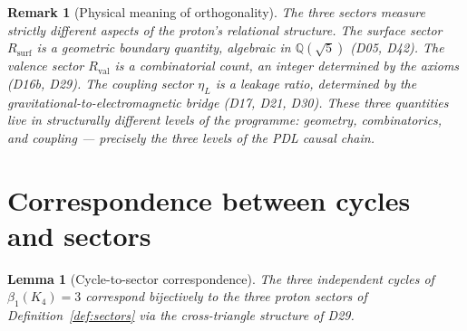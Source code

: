 \documentclass[12pt,a4paper]{article}
\newtheorem{lemma}[theorem]{Lemma}
\newtheorem{remark}[theorem]{Remark}
\newcommand{\Kfour}{K_4}
\newcommand{\Rsurf}{R_{\mathrm{surf}}}
\newcommand{\Rval}{R_{\mathrm{val}}}
\newcommand{\etaL}{\eta_L}
\begin{document}
\begin{remark}[Physical meaning of orthogonality]
The three sectors measure strictly different aspects of the proton's relational structure. The surface sector $\Rsurf$ is a geometric boundary quantity, algebraic in $\mathbb{Q}(\sqrt{5})$ (D05, D42). The valence sector $\Rval$ is a combinatorial count, an integer determined by the axioms (D16b, D29). The coupling sector $\etaL$ is a leakage ratio, determined by the gravitational-to-electromagnetic bridge (D17, D21, D30). These three quantities live in structurally different levels of the programme: geometry, combinatorics, and coupling — precisely the three levels of the PDL causal chain.
\end{remark}

\section{Correspondence between cycles and sectors}
\label{sec:correspondence}

\begin{lemma}[Cycle-to-sector correspondence]
\label{lem:correspondence}
The three independent cycles of $\beta_1(\Kfour) = 3$ correspond bijectively to the three proton sectors of Definition~\ref{def:sectors} via the cross-triangle structure of D29.
\end{lemma}
\end{document}
